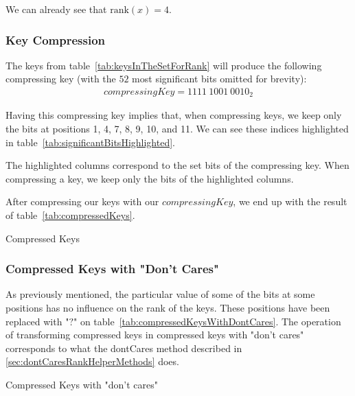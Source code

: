 We can already see that $\text{rank}(x) = 4$.

\subsubsection{Key Compression} \label{sec:keyCompression}

The keys from table~\ref{tab:keysInTheSetForRank} will produce the following compressing key (with the $52$ most significant bits omitted for brevity):
\begin{align*}
    compressingKey = 1111\ 1001\ 0010_2
\end{align*}

Having this compressing key implies that, when compressing keys, we keep only the bits at positions 1, 4, 7, 8, 9, 10, and 11. We can see these indices highlighted in table~\ref{tab:significantBitsHighlighted}.

\begin{table}[H]
\centering

\caption[Example of bits that are kept when compressing keys]{The highlighted columns correspond to the set bits of the compressing key. When compressing a key, we keep only the bits of the highlighted columns.}
\label{tab:significantBitsHighlighted}
\end{table}

After compressing our keys with our $compressingKey$, we end up with the result of table~\ref{tab:compressedKeys}.

\begin{table}[H]
\centering

\caption[Example of compressed keys]{Compressed Keys}
\label{tab:compressedKeys}
\end{table}

\subsubsection{Compressed Keys with "Don't Cares"} \label{sec:keyCompressionWithDontCares}

As previously mentioned, the particular value of some of the bits at some positions has no influence on the rank of the keys. These positions have been replaced with "$?$" on table~\ref{tab:compressedKeysWithDontCares}. The operation of transforming compressed keys in compressed keys with "don't cares" corresponds to what the {\ttfamily dontCares} method described in \ref{sec:dontCaresRankHelperMethods} does.

\begin{table}[H]
\centering

\caption[Example of compressed keys with "don't cares"]{Compressed Keys with "don't cares"}
\label{tab:compressedKeysWithDontCares}
\end{table}

